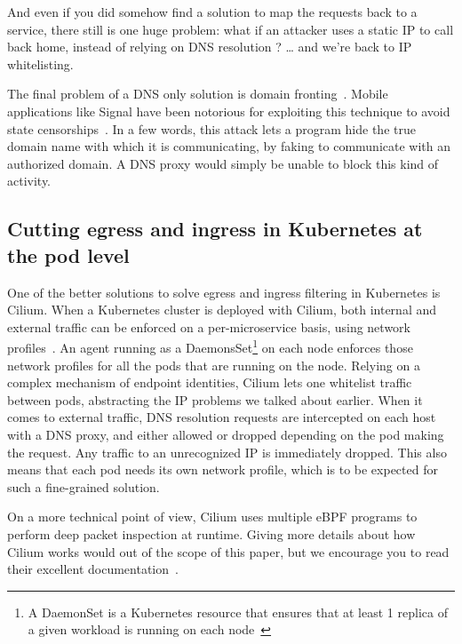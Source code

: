 And even if you did somehow find a solution to map the requests back to a service, there still is one huge problem: what if an attacker uses a static IP to call back home, instead of relying on DNS resolution ? … and we’re back to IP whitelisting.

The final problem of a DNS only solution is domain fronting~\cite{ProcessLevelNetworkSecurityMonitoring:DavidFifieldChangLanRodHynesPercyWegmannVernPaxson}. Mobile applications like Signal have been notorious for exploiting this technique to avoid state censorships~\cite{ProcessLevelNetworkSecurityMonitoring:Signal}. In a few words, this attack lets a program hide the true domain name with which it is communicating, by faking to communicate with an authorized domain. A DNS proxy would simply be unable to block this kind of activity.


\subsection{Cutting egress and ingress in Kubernetes at the pod level}

One of the better solutions to solve egress and ingress filtering in Kubernetes is Cilium. When a Kubernetes cluster is deployed with Cilium, both internal and external traffic can be enforced on a per-microservice basis, using network profiles~\cite{ProcessLevelNetworkSecurityMonitoring:Cilium}. An agent running as a DaemonsSet\footnote{A DaemonSet is a Kubernetes resource that ensures that at least 1 replica of a given workload is running on each node~\cite{ProcessLevelNetworkSecurityMonitoring:JohnArundelJustinDomingus}} on each node enforces those network profiles for all the pods that are running on the node. Relying on a complex mechanism of endpoint identities, Cilium lets one whitelist traffic between pods, abstracting the IP problems we talked about earlier. When it comes to external traffic, DNS resolution requests are intercepted on each host with a DNS proxy, and either allowed or dropped depending on the pod making the request. Any traffic to an unrecognized IP is immediately dropped. This also means that each pod needs its own network profile, which is to be expected for such a fine-grained solution.

On a more technical point of view, Cilium uses multiple eBPF programs to perform deep packet inspection at runtime. Giving more details about how Cilium works would out of the scope of this paper, but we encourage you to read their excellent documentation~\cite{ProcessLevelNetworkSecurityMonitoring:Cilium}.

